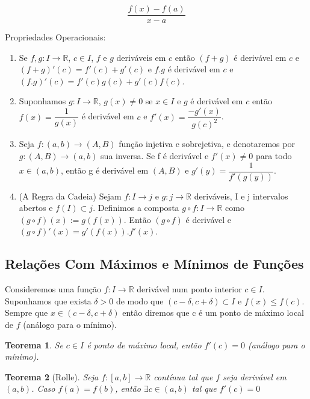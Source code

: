 \documentclass[12pt]{article}
\newtheorem{theorem}{Teorema}[section]
\begin{document}
$$\dfrac{f(x) - f(a)}{x - a}$$

Propriedades Operacionais:
\begin{enumerate}
    \item Se $f, g : I \rightarrow{} \mathbb{R}$, $c \in I$, $f$ e $g$ deriváveis em $c$ então $(f+g)$ é derivável em $c$ e $(f+g)'(c) = f'(c) + g'(c)$ e $f . g$ é derivável em $c$ e $(f . g)'(c) = f'(c) g(c) + g'(c) f(c)$.
    
    \item Suponhamos $g: I \rightarrow{} \mathbb{R}$, $g(x) \neq 0$ se $x \in I$ e $g$ é derivável em $c$ então $f(x) = \dfrac{1}{g(x)}$ é derivável em $c$ e $f'(x) = \dfrac{- g'(x)}{g(c)^2}$.
    
    \item Seja $f: (a, b) \rightarrow{} (A, B)$ função injetiva e sobrejetiva, e denotaremos por $g: (A, B) \rightarrow{} (a, b)$ sua inversa. Se f é derivável e $f'(x) \neq 0$ para todo $x \in (a, b)$, então g é derivável em $(A, B)$ e $g'(y) = \dfrac{1}{f'(g(y))}$.
    
    \item (A Regra da Cadeia) Sejam $f: I \rightarrow{} j$ e $g: j \rightarrow{} \mathbb{R}$ deriváveis, I e j intervalos abertos e $f(I) \subset j$. Definimos a composta $g \circ f: I \rightarrow{} \mathbb{R}$ como $(g \circ f)(x):=g(f(x))$. Então $(g \circ f)$ é derivável e $(g \circ f)'(x) = g'(f(x)).f'(x)$.
\end{enumerate}

\subsection{Relações Com Máximos e Mínimos de Funções}

Consideremos uma função $f: I \rightarrow{} \mathbb{R}$ derivável num ponto interior $c \in I$. Suponhamos que exista $\delta > 0$ de modo que $(c - \delta, c + \delta) \subset I$ e $f(x) \leq f(c)$. Sempre que $x \in (c - \delta, c + \delta)$ então diremos que c é um ponto de máximo local de $f$ (análogo para o mínimo).

\begin{theorem}
    Se $c \in I$ é ponto de máximo local, então $f'(c) = 0$ (análogo para o mínimo).
\end{theorem}

\begin{theorem}[Rolle] Seja $f: [a, b] \rightarrow{} \mathbb{R}$ contínua tal que $f$ seja derivável em $(a, b)$. Caso $f(a) = f(b)$, então $\exists c \in (a, b)$ tal que $f'(c) = 0$
\end{theorem}
\end{document}
